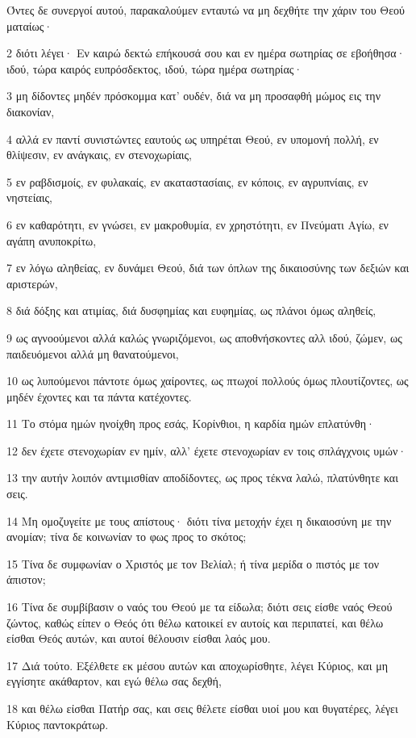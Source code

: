 \par Όντες δε συνεργοί αυτού, παρακαλούμεν ενταυτώ να μη δεχθήτε την χάριν του Θεού ματαίως·
\par 2 διότι λέγει· Εν καιρώ δεκτώ επήκουσά σου και εν ημέρα σωτηρίας σε εβοήθησα· ιδού, τώρα καιρός ευπρόσδεκτος, ιδού, τώρα ημέρα σωτηρίας·
\par 3 μη δίδοντες μηδέν πρόσκομμα κατ' ουδέν, διά να μη προσαφθή μώμος εις την διακονίαν,
\par 4 αλλά εν παντί συνιστώντες εαυτούς ως υπηρέται Θεού, εν υπομονή πολλή, εν θλίψεσιν, εν ανάγκαις, εν στενοχωρίαις,
\par 5 εν ραβδισμοίς, εν φυλακαίς, εν ακαταστασίαις, εν κόποις, εν αγρυπνίαις, εν νηστείαις,
\par 6 εν καθαρότητι, εν γνώσει, εν μακροθυμία, εν χρηστότητι, εν Πνεύματι Αγίω, εν αγάπη ανυποκρίτω,
\par 7 εν λόγω αληθείας, εν δυνάμει Θεού, διά των όπλων της δικαιοσύνης των δεξιών και αριστερών,
\par 8 διά δόξης και ατιμίας, διά δυσφημίας και ευφημίας, ως πλάνοι όμως αληθείς,
\par 9 ως αγνοούμενοι αλλά καλώς γνωριζόμενοι, ως αποθνήσκοντες αλλ ιδού, ζώμεν, ως παιδευόμενοι αλλά μη θανατούμενοι,
\par 10 ως λυπούμενοι πάντοτε όμως χαίροντες, ως πτωχοί πολλούς όμως πλουτίζοντες, ως μηδέν έχοντες και τα πάντα κατέχοντες.
\par 11 Το στόμα ημών ηνοίχθη προς εσάς, Κορίνθιοι, η καρδία ημών επλατύνθη·
\par 12 δεν έχετε στενοχωρίαν εν ημίν, αλλ' έχετε στενοχωρίαν εν τοις σπλάγχνοις υμών·
\par 13 την αυτήν λοιπόν αντιμισθίαν αποδίδοντες, ως προς τέκνα λαλώ, πλατύνθητε και σεις.
\par 14 Μη ομοζυγείτε με τους απίστους· διότι τίνα μετοχήν έχει η δικαιοσύνη με την ανομίαν; τίνα δε κοινωνίαν το φως προς το σκότος;
\par 15 Τίνα δε συμφωνίαν ο Χριστός με τον Βελίαλ; ή τίνα μερίδα ο πιστός με τον άπιστον;
\par 16 Τίνα δε συμβίβασιν ο ναός του Θεού με τα είδωλα; διότι σεις είσθε ναός Θεού ζώντος, καθώς είπεν ο Θεός ότι θέλω κατοικεί εν αυτοίς και περιπατεί, και θέλω είσθαι Θεός αυτών, και αυτοί θέλουσιν είσθαι λαός μου.
\par 17 Διά τούτο. Εξέλθετε εκ μέσου αυτών και αποχωρίσθητε, λέγει Κύριος, και μη εγγίσητε ακάθαρτον, και εγώ θέλω σας δεχθή,
\par 18 και θέλω είσθαι Πατήρ σας, και σεις θέλετε είσθαι υιοί μου και θυγατέρες, λέγει Κύριος παντοκράτωρ.

